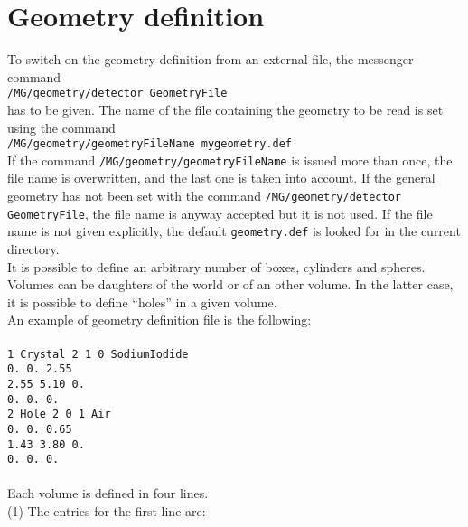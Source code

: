 \documentclass[a4paper,12pt,twoside]{article}
\begin{document}
\section{Geometry definition} 
To switch on the geometry definition from an external file, the messenger 
command \\
\texttt{/MG/geometry/detector GeometryFile} \\
has to be given. The name of the file containing the geometry to be read 
is set using the command \\
\texttt{/MG/geometry/geometryFileName mygeometry.def} \\
If the command \texttt{/MG/geometry/geometryFileName} is issued more than 
once, the file name is overwritten, and the last one is taken into account. 
If the general geometry has not been set with the command 
\texttt{/MG/geometry/detector GeometryFile}, the file name is anyway accepted 
but it is not used. If the file name is not given explicitly, the default 
\texttt{geometry.def} is looked for in the current directory. \\
It is possible to define an arbitrary 
number of boxes, cylinders and spheres. Volumes can be daughters of the 
world or of an other volume. In the latter case, it is possible to define 
``holes'' in a given volume. \\
An example of geometry definition file is the following: \\
\texttt{\\
1 Crystal 2 1 0 SodiumIodide   \\
0. 0. 2.55 \\
2.55 5.10 0. \\
0. 0. 0. \\
2 Hole    2 0 1 Air\\             
0. 0. 0.65 \\
1.43 3.80 0.\\
0. 0. 0. \\
\\}
Each volume is defined in four lines. \\
(1) The entries for the first line are:
\end{document}
